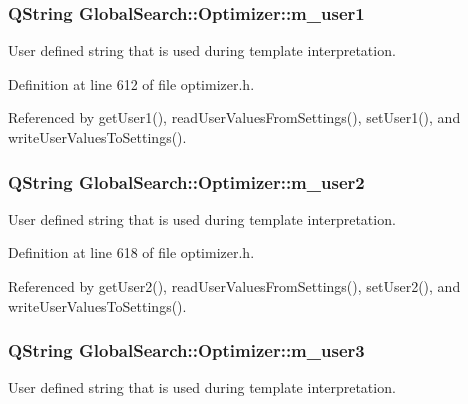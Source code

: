 \hypertarget{classGlobalSearch_1_1Optimizer_ae300aaecb74a7a61a501e4b8bd988957}{
\subsubsection[{m\-\_\-user1}]{\setlength{\rightskip}{0pt plus 5cm}Q\-String Global\-Search\-::\-Optimizer\-::m\-\_\-user1\hspace{0.3cm}{\ttfamily [protected]}}}\label{classGlobalSearch_1_1Optimizer_ae300aaecb74a7a61a501e4b8bd988957}
User defined string that is used during template interpretation. 

Definition at line 612 of file optimizer.\-h.



Referenced by get\-User1(), read\-User\-Values\-From\-Settings(), set\-User1(), and write\-User\-Values\-To\-Settings().

\hypertarget{classGlobalSearch_1_1Optimizer_a5ca1294d2a3aa119dfab655dfa270d3a}{
\subsubsection[{m\-\_\-user2}]{\setlength{\rightskip}{0pt plus 5cm}Q\-String Global\-Search\-::\-Optimizer\-::m\-\_\-user2\hspace{0.3cm}{\ttfamily [protected]}}}\label{classGlobalSearch_1_1Optimizer_a5ca1294d2a3aa119dfab655dfa270d3a}
User defined string that is used during template interpretation. 

Definition at line 618 of file optimizer.\-h.



Referenced by get\-User2(), read\-User\-Values\-From\-Settings(), set\-User2(), and write\-User\-Values\-To\-Settings().

\hypertarget{classGlobalSearch_1_1Optimizer_a279ca8ed61d6ca36f70c5c69b4d57397}{
\subsubsection[{m\-\_\-user3}]{\setlength{\rightskip}{0pt plus 5cm}Q\-String Global\-Search\-::\-Optimizer\-::m\-\_\-user3\hspace{0.3cm}{\ttfamily [protected]}}}\label{classGlobalSearch_1_1Optimizer_a279ca8ed61d6ca36f70c5c69b4d57397}
User defined string that is used during template interpretation. 

